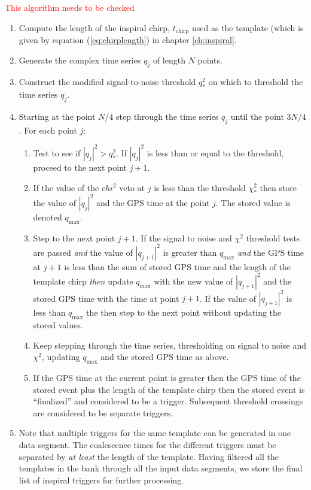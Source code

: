 \textcolor{red}{This algorithm needs to be checked}
\begin{enumerate}
\item Compute the length of the inspiral chirp, $t_\mathrm{chirp}$ used as the
template (which is given by equation (\ref{eq:chirplength}) in chapter
\ref{ch:inspiral}.

\item Generate the complex time series $q_j$ of length $N$ points.

\item Construct the modified signal-to-noise threshold $q^2_\ast$
on which to threshold the time series $q_j$.

\item Starting at the point $N/4$ step through the time series $q_j$ until the
point $3N/4$. For each point $j$: 
\begin{enumerate}
\item Test to see if $|q_j|^2 > q^2_\ast$. If $|q_j|^2$ is less than or equal
to the threshold, proceed to the next point $j+1$.

\item If the value of the $chi^2$ veto at $j$ is less than the threshold
$\chi^2_\ast$ then store the value of $|q_j|^2$ and the GPS time at the point
$j$.  The stored value is denoted $q_{\mathrm{max}}$.

\item Step to the next point $j+1$. If the signal to noise and $\chi^2$
threshold tests are passed \textit{and} the value of $|q_{j+1}|^2$ is
greater than $q_{\mathrm{max}}$ \textit{and} the GPS time at $j+1$ is less
than the sum of stored GPS time and the length of the template chirp
\textit{then} update $q_{\mathrm{max}}$ with the new value of $|q_{j+1}|^2$
and the stored GPS time with the time at point $j+1$.  If the value of
$|q_{j+1}|^2$ is less than $q_{\mathrm{max}}$ the then step to the next point
without updating the stored values. 

\item Keep stepping through the time series, thresholding on signal to noise
and $\chi^2$, updating $q_{\mathrm{max}}$ and the stored GPS time as above.

\item If the GPS time at the current point is greater then the GPS time of the
stored event plus the length of the template chirp then the stored event is
``finalized'' and considered to be a trigger. Subsequent threshold crossings are
considered to be separate triggers.
\end{enumerate}

\item Note that multiple triggers for the same template can be generated in
one data segment. The coalescence times for the different triggers must be
separated by \textit{at least} the length of the template. Having filtered all
the templates in the bank through all the input data segments, we store the
final list of inspiral triggers for further processing.
\end{enumerate}

